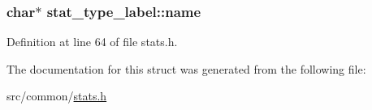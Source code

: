 \hypertarget{structstat__type__label_a4dc872fb0d9d5fb81f1931319d4b1eff}{
\subsubsection[{name}]{\setlength{\rightskip}{0pt plus 5cm}char$\ast$ stat\-\_\-type\-\_\-label\-::name}}\label{structstat__type__label_a4dc872fb0d9d5fb81f1931319d4b1eff}


Definition at line 64 of file stats.\-h.



The documentation for this struct was generated from the following file\-:\begin{DoxyCompactItemize}
\item 
src/common/\hyperlink{stats_8h}{stats.\-h}\end{DoxyCompactItemize}
